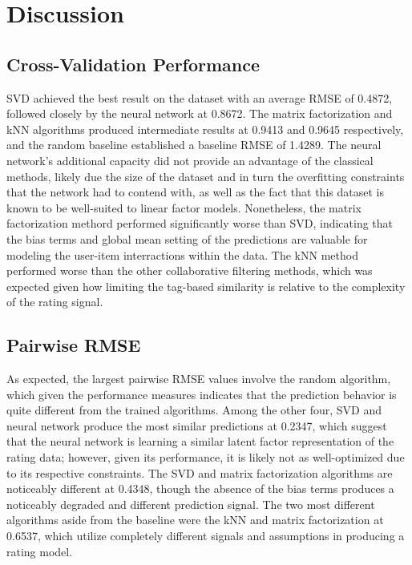 \section{Discussion}

\subsection{Cross-Validation Performance}

SVD achieved the best result on the dataset with an average RMSE of 0.4872, followed closely by the neural network at 0.8672. The matrix factorization and kNN
algorithms produced intermediate results at 0.9413 and 0.9645 respectively, and the random baseline established a baseline RMSE of 1.4289. The neural network's additional
capacity did not provide an advantage of the classical methods, likely due the size of the dataset and in turn the overfitting constraints that the network had to contend with,
as well as the fact that this dataset is known to be well-suited to linear factor models. Nonetheless, the matrix factorization methord performed significantly worse than SVD,
indicating that the bias terms and global mean setting of the predictions are valuable for modeling the user-item interractions within the data. The kNN method performed worse than
the other collaborative filtering methods, which was expected given how limiting the tag-based similarity is relative to the complexity of the rating signal.

\subsection{Pairwise RMSE}

As expected, the largest pairwise RMSE values involve the random algorithm, which given the performance measures indicates that the prediction behavior is quite different from the 
trained algorithms. Among the other four, SVD and neural network produce the most similar predictions at 0.2347, which suggest that the neural network is learning a similar latent factor 
representation of the rating data; however, given its performance, it is likely not as well-optimized due to its respective constraints. The SVD and matrix factorization algorithms
are noticeably different at 0.4348, though the absence of the bias terms produces a noticeably degraded and different prediction signal. The two most different algorithms aside from the baseline
were the kNN and matrix factorization at 0.6537, which utilize completely different signals and assumptions in producing a rating model.